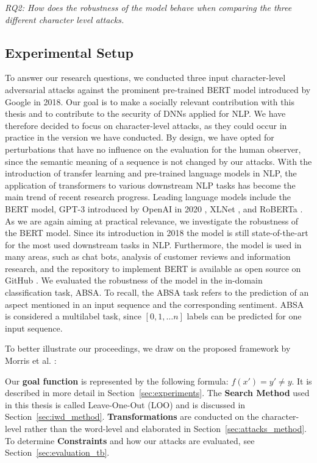 \textit{RQ2: How does the robustness of the model behave when comparing the three different character level attacks.}



\subsection{Experimental Setup} 
To answer our research questions, we conducted three input character-level adversarial attacks against the prominent pre-trained BERT model introduced by Google in 2018. 
Our goal is to make a socially relevant contribution with this thesis and to contribute to the security of DNNs applied for NLP. We have therefore decided to focus on character-level attacks, as they could occur in practice in the version we have conducted. By design, we have opted for perturbations that have no influence on the evaluation for the human observer, since the semantic meaning of a sequence is not changed by our attacks. 
With the introduction of transfer learning and pre-trained language models in NLP, the application of transformers to various downstream NLP tasks has become the main trend of recent research progress. Leading language models include the BERT model, GPT-3 introduced by OpenAI in 2020 \cite{brown2020language}, XLNet \cite{yang2019xlnet}, and RoBERTa \cite{liu2019roberta}. As we are again aiming at practical relevance, we investigate the robustness of the BERT model. Since its introduction in 2018 the model is still state-of-the-art for the most used downstream tasks in NLP. Furthermore, the model is used in many areas, such as chat bots, analysis of customer reviews and information research, and the repository to implement BERT is available as open source on GitHub \cite{tum_2020}.  
We evaluated the robustness of the model in the in-domain classification task, ABSA. To recall, the ABSA task refers to the prediction of an aspect mentioned in an input sequence and the corresponding sentiment. ABSA is considered a multilabel task, since $[0,1, \dots n]$ labels can be predicted for one input sequence. 

To better illustrate our proceedings, we draw on the proposed framework by Morris et al. \cite{morris2020textattack}:

Our \textbf{goal function} is represented by the following formula: ${f( x' ) = y' \neq y}$.
It is described in more detail in Section~\ref{sec:experiments}. The \textbf{Search Method} used in this thesis is called Leave-One-Out (LOO) and is discussed in Section~\ref{sec:iwd_method}. \textbf{Transformations} are conducted on the character-level rather than the word-level and elaborated in Section~\ref{sec:attacks_method}. To determine \textbf{Constraints} and how our attacks are evaluated, see Section~\ref{sec:evaluation_tb}.


